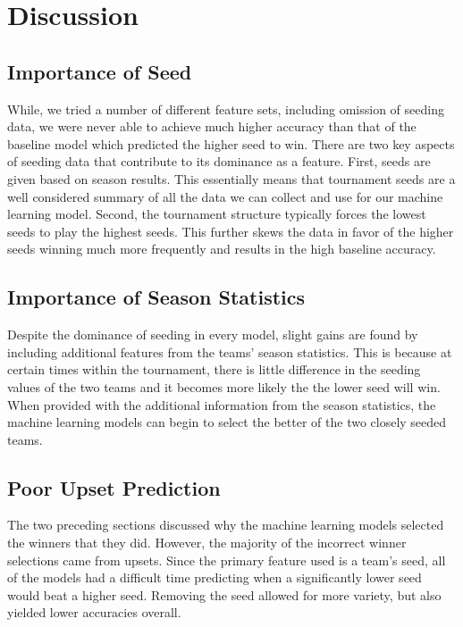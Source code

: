 \section{Discussion}
\subsection{Importance of Seed}
While, we tried a number of different feature sets, including omission of seeding data, we were never able to achieve much higher accuracy than that of the baseline model which predicted the higher seed to win.
There are two key aspects of seeding data that contribute to its dominance as a feature.
First, seeds are given based on season results.
This essentially means that tournament seeds are a well considered summary of all the data we can collect and use for our machine learning model.
Second, the tournament structure typically forces the lowest seeds to play the highest seeds.
This further skews the data in favor of the higher seeds winning much more frequently and results in the high baseline accuracy.

\subsection{Importance of Season Statistics}
Despite the dominance of seeding in every model, slight gains are found by including additional features from the teams' season statistics.
This is because at certain times within the tournament, there is little difference in the seeding values of the two teams and it becomes more likely the the lower seed will win.
When provided with the additional information from the season statistics, the machine learning models can begin to select the better of the two closely seeded teams.

\subsection{Poor Upset Prediction}
The two preceding sections discussed why the machine learning models selected the winners that they did.
However, the majority of the incorrect winner selections came from upsets.
Since the primary feature used is a team's seed, all of the models had a difficult time predicting when a significantly lower seed would beat a higher seed.
Removing the seed allowed for more variety, but also yielded lower accuracies overall.
